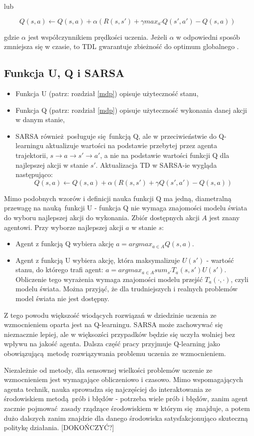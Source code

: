 lub

$$Q(s,a) \leftarrow Q(s,a) + \alpha (R(s,s') + \gamma max_{a'}Q(s',a') - Q (s,a))$$


gdzie $\alpha$ jest współczynnikiem prędkości uczenia. Jeżeli $\alpha$ w odpowiedni sposób zmniejsza się w czasie, to TDL gwarantuje zbieżność do optimum globalnego \cite{wjaskowski2016}. 

\subsection{Funkcja U, Q i SARSA}
\begin{itemize}
\item Funkcja U (patrz: rozdział \ref{mdp}) opisuje użyteczność stanu,
\item Funkcja Q (patrz: rozdział \ref{mdp}) opisuje użyteczność wykonania danej akcji w danym stanie,
\item SARSA również posługuje się funkcją Q, ale w przeciwieństwie do Q-learningu aktualizuje wartości na podstawie przebytej przez agenta trajektorii, $ s \rightarrow a \rightarrow s' \rightarrow a'$, a nie na podstawie wartości funkcji Q dla najlepszej akcji w stanie $s'$. Aktualizacja TD w SARSA-ie wygląda następująco:
$$Q(s,a) \leftarrow Q(s,a) + \alpha (R(s,s') + \gamma Q(s',a') - Q (s,a))$$
\end{itemize}

Mimo podobnych wzorów i definicji nauka funkcji Q ma jedną, diametralną przewagę na nauką funkcji U - funkcja Q nie wymaga znajomości modelu świata do wyboru najlepszej akcji do wykonania. Zbiór dostępnych akcji $A$ jest znany agentowi. Przy wyborze najlepszej akcji $a$ w stanie $s$:
\begin{itemize}
\item Agent z funkcją Q wybiera akcję $a = argmax_{a \in A} Q(s,a)$.

\item Agent z funkcją U wybiera akcję, która maksymalizuje $U(s')$ - wartość stanu, do którego trafi agent: $a = argmax_{a \in A} sum_{s'} T_a(s,s')U(s')$. Obliczenie tego wyrażenia wymaga znajomości modelu przejść $T_a(\cdot, \cdot)$, czyli modelu świata. Można przyjąć, że dla trudniejszych i realnych problemów model świata nie jest dostępny.
\end{itemize}

Z tego powodu większość wiodących rozwiązań w dziedzinie uczenia ze wzmocnieniem oparta jest na Q-learningu. SARSA może zachowywać się nieznacznie lepiej, ale w więksozści przypadków będzie się uczyła wolniej bez wpływu na jakość agenta. Dalsza część pracy przyjmuje Q-learning jako obowiązującą metodę rozwiązywania problemu uczenia ze wzmocnieniem.

Niezależnie od metody, dla sensownej wielkości problemów uczenie ze wzmocnieniem jest wymagające obliczeniowo i czasowo. Mimo wspomagających agenta technik, nauka sprowadza się najczęściej do interaktowania ze środowiskiem metodą prób i błędów - potrzeba wiele prób i błędów, zanim agent zacznie pojmować zasady rządzące środowiskiem w którym się znajduje, a potem dużo dalszych zanim znajdzie dla danego środowiska satysfakcjonująco skuteczną politykę działania.
[DOKOŃCZYĆ?]

